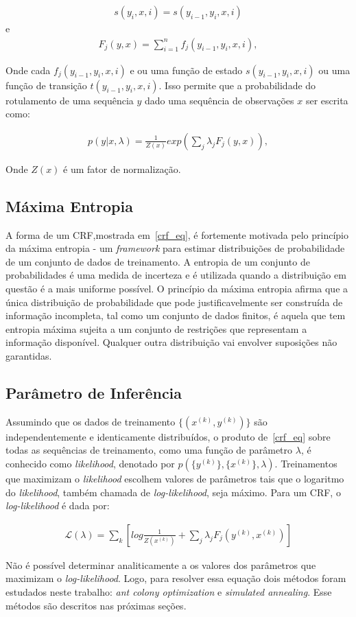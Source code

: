 \begin{eqnarray}
  s(y_i,x,i)=s(y_{i-1},y_i,x,i)
\end{eqnarray}
e
\begin{eqnarray}
  F_j(y,x) = \sum_{i=1}^n f_j(y_{i-1},y_i,x,i),
\end{eqnarray}

Onde cada $f_j(y_{i-1},y_i,x,i)$ e ou uma função de estado $s(y_{i-1},y_i,x,i)$
ou uma função de transição $t(y_{i-1},y_i,x,i)$. Isso permite que a probabilidade
do rotulamento de uma sequência $y$ dado uma sequência de observações $x$ ser escrita
como:

\begin{eqnarray}
  p(y|x,\lambda) = \frac{1}{Z(x)} exp(\sum_j \lambda_j F_j(y,x)),
\end{eqnarray}

Onde $Z(x)$ é um fator de normalização.

\subsection{Máxima Entropia}

A forma de um CRF,mostrada em~\ref{crf_eq}, é fortemente motivada pelo princípio da
máxima entropia - um \textit{framework} para estimar distribuições de probabilidade
de um conjunto de dados de treinamento. A entropia de um conjunto de probabilidades
é uma medida de incerteza e é utilizada quando a distribuição em questão é a mais
uniforme possível. O princípio da máxima entropia afirma que a única distribuição
de probabilidade que pode justificavelmente ser construída de informação incompleta,
tal como um conjunto de dados finitos, é aquela que tem entropia máxima sujeita a
um conjunto de restrições que representam a informação disponível. Qualquer outra
distribuição vai envolver suposições não garantidas.

\subsection{Parâmetro de Inferência}

Assumindo que os dados de treinamento $\lbrace (x^{(k)},y^{(k)}) \rbrace$
são independentemente e identicamente distribuídos, o produto de~\ref{crf_eq}
sobre todas as sequências de treinamento, como uma função de parâmetro $\lambda$,
é conhecido como \textit{likelihood}, denotado por $p(\lbrace y^{(k)}\rbrace,\lbrace
x^{(k)}\rbrace, \lambda)$. Treinamentos que maximizam o \textit{likelihood} escolhem
valores de parâmetros tais que o logaritmo do \textit{likelihood}, também chamada de
\textit{log-likelihood}, seja máximo. Para um CRF, o \textit{log-likelihood} é dada por:

\begin{eqnarray}
  \mathcal{L}(\lambda) = \sum_k \left[ log\frac{1}{Z(x^{(k)})}+
    \sum_j \lambda_j F_j(y^{(k)},x^{(k)}) \right]
\end{eqnarray}

Não é possível determinar analiticamente a os valores dos parâmetros que maximizam
o \textit{log-likelihood}. Logo, para resolver essa equação dois métodos foram estudados
neste trabalho: \textit{ant colony optimization} e \textit{simulated annealing}.
Esse métodos são descritos nas próximas seções.
